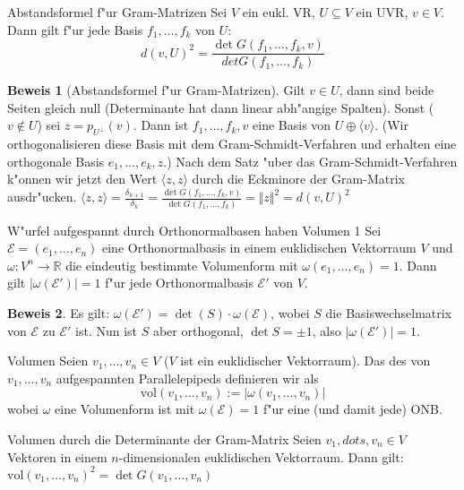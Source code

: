 \documentclass[oneside,fontsize=11pt,paper=a4,BCOR=0mm,DIV=12,automark,headsepline]{scrbook}
\theoremstyle{remark}
\theoremstyle{definition}
\theoremstyle{definition}
\newtheorem*{prof}{Beweis}
\theoremstyle{remark}
\begin{document}
\begin{satz}{Abstandsformel f"ur Gram-Matrizen}{}
  Sei $V$ ein eukl. VR, $U\subseteq V$ ein UVR, $v\in V$. Dann gilt f"ur jede
  Basis $f_1, \ldots, f_k$ von $U$: \[d(v,U)^2 = \frac{\det G(f_1, \ldots, f_k, v)}{det G(f_1, \ldots, f_k)}\]
\end{satz}

\begin{prof}[Abstandsformel f"ur Gram-Matrizen]
  Gilt \(v\in U\), dann sind beide Seiten gleich null (Determinante hat dann linear abh"angige Spalten). Sonst (\(v \not\in U\)) sei \(z = p_{U^\perp}(v)\). Dann ist \(f_1, \dots, f_k, v\) eine Basis von \(U\oplus \langle v\rangle\). (Wir orthogonalisieren diese Basis mit dem Gram-Schmidt-Verfahren und erhalten eine orthogonale Basis \(e_1, \dots, e_k, z\).) Nach dem Satz "uber das Gram-Schmidt-Verfahren k"onnen wir jetzt den Wert \(\langle z, z\rangle\) durch die Eckminore der Gram-Matrix ausdr"ucken. \(\langle z,z\rangle = \frac{\delta_{k+1}}{\delta_k} = \frac{\det G(f_1,\dots, f_k, v)}{\det G(f_1, \dots, f_k)} = \Vert z\Vert^2 = d(v, U)^2\)
\end{prof}
\begin{satz}{W"urfel aufgespannt durch Orthonormalbasen haben Volumen 1}{}
  Sei \(\mathcal{E} = (e_1,\dots,e_n)\) eine Orthonormalbasis in einem euklidischen Vektorraum \(V\) und \(\omega : V^n\to\mathbb{R}\) die eindeutig bestimmte Volumenform mit \(\omega (e_1,\dots,e_n) = 1\). Dann gilt \(|\omega (\mathcal{E'})| = 1\) f"ur jede Orthonormalbasis \(\mathcal{E}'\) von \(V\).
\end{satz}
\begin{prof}
  Es gilt: \(\omega (\mathcal{E}') = \det (S)\cdot\omega (\mathcal{E})\), wobei \(S\) die Basiswechselmatrix von \(\mathcal{E}\) zu \(\mathcal{E}'\) ist. Nun ist \(S\) aber orthogonal, \(\det S = \pm 1\), also \(|\omega (\mathcal{E}')| = 1\).
\end{prof}
\begin{definition}{Volumen}{}
  Seien \(v_1,\dots, v_n\in V\) (\(V\) ist ein euklidischer Vektorraum). Das  des von \(v_1,\dots, v_n\) aufgespannten Parallelepipeds definieren wir als \[\text{vol}(v_1,\dots,v_n) := |\omega (v_1,\dots,v_n)|\] wobei \(\omega\) eine Volumenform ist mit \(\omega (\mathcal{E}) = 1\) f"ur eine (und damit jede) ONB.
\end{definition}
\begin{satz}{Volumen durch die Determinante der Gram-Matrix}{}
  Seien \(v_1,dots,v_n\in V\) Vektoren in einem \(n\)-dimensionalen euklidischen Vektorraum. Dann gilt: \(\text{vol}(v_1,\dots,v_n)^2 = \det G(v_1,\dots,v_n)\)
\end{satz}
\end{document}

